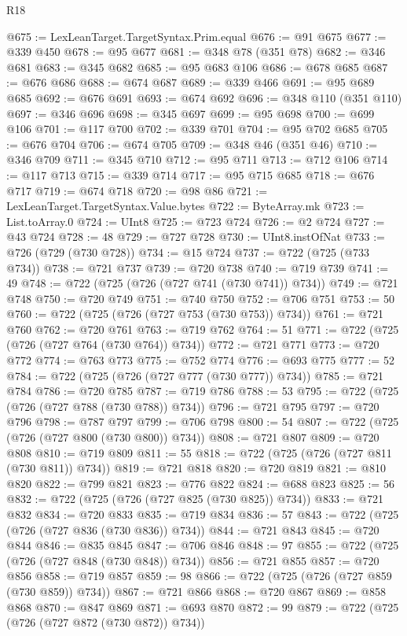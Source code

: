 \begin{lexlean}{R18}
\begin{coremodule}
@675 := LexLeanTarget.TargetSyntax.Prim.equal
@676 := @91 @675
@677 := @339 @450
@678 := @95 @677
@681 := @348 @78 (@351 @78)
@682 := @346 @681
@683 := @345 @682
@685 := @95 @683 @106
@686 := @678 @685
@687 := @676 @686
@688 := @674 @687
@689 := @339 @466
@691 := @95 @689 @685
@692 := @676 @691
@693 := @674 @692
@696 := @348 @110 (@351 @110)
@697 := @346 @696
@698 := @345 @697
@699 := @95 @698
@700 := @699 @106
@701 := @117 @700
@702 := @339 @701
@704 := @95 @702 @685
@705 := @676 @704
@706 := @674 @705
@709 := @348 @46 (@351 @46)
@710 := @346 @709
@711 := @345 @710
@712 := @95 @711
@713 := @712 @106
@714 := @117 @713
@715 := @339 @714
@717 := @95 @715 @685
@718 := @676 @717
@719 := @674 @718
@720 := @98 @86
@721 := LexLeanTarget.TargetSyntax.Value.bytes
@722 := ByteArray.mk
@723 := List.toArray.{0}
@724 := UInt8
@725 := @723 @724
@726 := @2 @724
@727 := @43 @724
@728 := 48
@729 := @727 @728
@730 := UInt8.instOfNat
@733 := @726 (@729 (@730 @728))
@734 := @15 @724
@737 := @722 (@725 (@733 @734))
@738 := @721 @737
@739 := @720 @738
@740 := @719 @739
@741 := 49
@748 := @722 (@725 (@726 (@727 @741 (@730 @741)) @734))
@749 := @721 @748
@750 := @720 @749
@751 := @740 @750
@752 := @706 @751
@753 := 50
@760 := @722 (@725 (@726 (@727 @753 (@730 @753)) @734))
@761 := @721 @760
@762 := @720 @761
@763 := @719 @762
@764 := 51
@771 := @722 (@725 (@726 (@727 @764 (@730 @764)) @734))
@772 := @721 @771
@773 := @720 @772
@774 := @763 @773
@775 := @752 @774
@776 := @693 @775
@777 := 52
@784 := @722 (@725 (@726 (@727 @777 (@730 @777)) @734))
@785 := @721 @784
@786 := @720 @785
@787 := @719 @786
@788 := 53
@795 := @722 (@725 (@726 (@727 @788 (@730 @788)) @734))
@796 := @721 @795
@797 := @720 @796
@798 := @787 @797
@799 := @706 @798
@800 := 54
@807 := @722 (@725 (@726 (@727 @800 (@730 @800)) @734))
@808 := @721 @807
@809 := @720 @808
@810 := @719 @809
@811 := 55
@818 := @722 (@725 (@726 (@727 @811 (@730 @811)) @734))
@819 := @721 @818
@820 := @720 @819
@821 := @810 @820
@822 := @799 @821
@823 := @776 @822
@824 := @688 @823
@825 := 56
@832 := @722 (@725 (@726 (@727 @825 (@730 @825)) @734))
@833 := @721 @832
@834 := @720 @833
@835 := @719 @834
@836 := 57
@843 := @722 (@725 (@726 (@727 @836 (@730 @836)) @734))
@844 := @721 @843
@845 := @720 @844
@846 := @835 @845
@847 := @706 @846
@848 := 97
@855 := @722 (@725 (@726 (@727 @848 (@730 @848)) @734))
@856 := @721 @855
@857 := @720 @856
@858 := @719 @857
@859 := 98
@866 := @722 (@725 (@726 (@727 @859 (@730 @859)) @734))
@867 := @721 @866
@868 := @720 @867
@869 := @858 @868
@870 := @847 @869
@871 := @693 @870
@872 := 99
@879 := @722 (@725 (@726 (@727 @872 (@730 @872)) @734))

\end{coremodule}
\end{lexlean}

